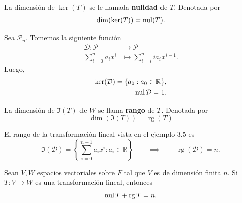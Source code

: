 \documentclass[12pt,a4paper]{book}
\DeclareMathOperator{\rg}{rg}
\newcommand{\llaves}[1]{\{#1\}}
\newcommand{\llavesgrandes}[1]{\left\{#1\right\}}
\begin{document}
    \begin{definicion}[Nulidad]
        La dimensión de $\ker(T)$ se le llamada \textbf{nulidad} de $T$. Denotada por
        \begin{equation*}
            \dim(\ker(T))=\operatorname{nul}(T).
        \end{equation*}
    \end{definicion}

    \begin{ejemplo}
        Sea $\mathcal{P}_n$. Tomemos la siguiente función
        \begin{align*}
            \mathcal{D}: \mathcal{P} & \to \mathcal{P}\\
            \sum_{i = 0}^na_ix^{i} & \mapsto \sum_{i = i}^nia_ix^{i-1}.
        \end{align*}
        Luego, 
        \begin{align*}
            \ker(\mathcal{D}) = \llaves{a_0:a_0 \in \mathbb{R}},\\
            \nul{\mathcal{D}} = 1.
        \end{align*}
    \end{ejemplo}

    \begin{definicion}[Rango]
        La dimensión de $\Im(T)$ de $W$ se llama \textbf{rango} de $T$. Denotada por
        \begin{equation*}
            \dim(\Im(T))=\rg(T)
        \end{equation*}
    \end{definicion}

    \begin{ejemplo}
        El rango de la transformación lineal vista en el ejemplo $3.5$ es 
    \begin{equation*}
        \Im(\mathcal{D})= \llavesgrandes{\sum_{i = 0}^{n-1}a_ix^{i}: a_i \in \mathbb{R}} \qquad \implies \qquad \rg(\mathcal{D}) = n.
    \end{equation*}
    \end{ejemplo}

    \begin{teorema}
        Sean $V, W$ espacios vectoriales sobre $F$ tal que $V$ es de dimensión finita $n$. Si $T:V \to W$ es una transformación lineal, entonces
        \begin{equation*}
            \nul{T} + \rg{T} = n.
        \end{equation*}
    \end{teorema}
\end{document}
